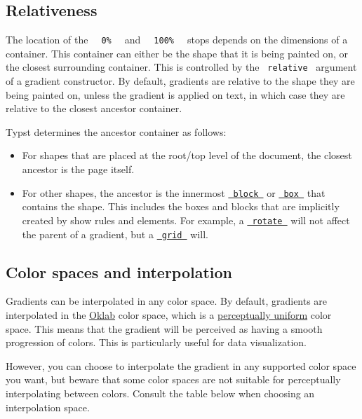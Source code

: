 \subsection{Relativeness}\label{relativeness}

The location of the \texttt{\ }{\texttt{\ 0\%\ }}\texttt{\ } and
\texttt{\ }{\texttt{\ 100\%\ }}\texttt{\ } stops depends on the
dimensions of a container. This container can either be the shape that
it is being painted on, or the closest surrounding container. This is
controlled by the \texttt{\ relative\ } argument of a gradient
constructor. By default, gradients are relative to the shape they are
being painted on, unless the gradient is applied on text, in which case
they are relative to the closest ancestor container.

Typst determines the ancestor container as follows:

\begin{itemize}
\tightlist
\item
  For shapes that are placed at the root/top level of the document, the
  closest ancestor is the page itself.
\item
  For other shapes, the ancestor is the innermost
  \href{/docs/reference/layout/block/}{\texttt{\ block\ }} or
  \href{/docs/reference/layout/box/}{\texttt{\ box\ }} that contains the
  shape. This includes the boxes and blocks that are implicitly created
  by show rules and elements. For example, a
  \href{/docs/reference/layout/rotate/}{\texttt{\ rotate\ }} will not
  affect the parent of a gradient, but a
  \href{/docs/reference/layout/grid/}{\texttt{\ grid\ }} will.
\end{itemize}

\subsection{Color spaces and
interpolation}\label{color-spaces-and-interpolation}

Gradients can be interpolated in any color space. By default, gradients
are interpolated in the
\href{/docs/reference/visualize/color/\#definitions-oklab}{Oklab} color
space, which is a
\href{https://programmingdesignsystems.com/color/perceptually-uniform-color-spaces/index.html}{perceptually
uniform} color space. This means that the gradient will be perceived as
having a smooth progression of colors. This is particularly useful for
data visualization.

However, you can choose to interpolate the gradient in any supported
color space you want, but beware that some color spaces are not suitable
for perceptually interpolating between colors. Consult the table below
when choosing an interpolation space.

